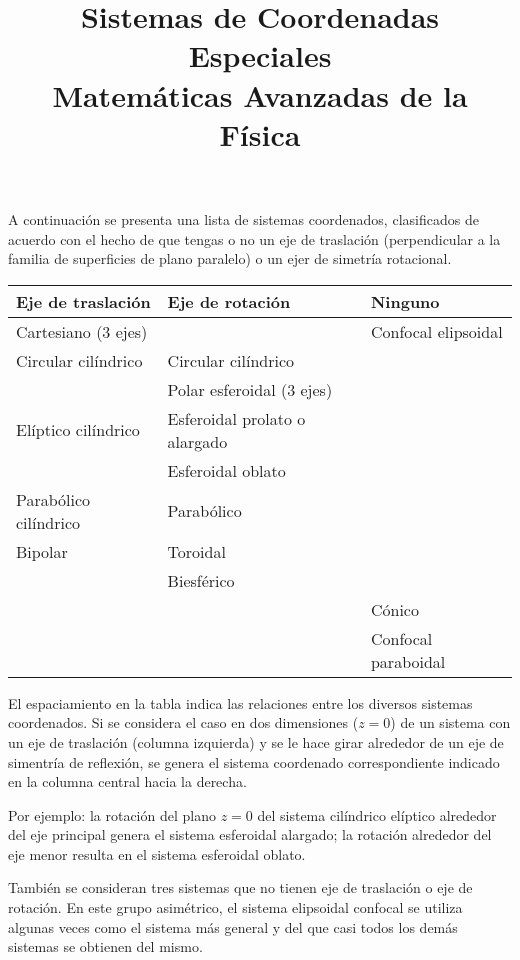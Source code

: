 
\author{}
\marginsize{1cm}{1cm}{1cm}{1cm} 
\title{Sistemas de Coordenadas Especiales \\ {\large Matemáticas Avanzadas de la Física}}
\date{ }

\renewcommand\labelenumii{\theenumi.{\arabic{enumii}}}
\maketitle
\fontsize{14}{14}\selectfont
\vspace{-2cm}
A continuación se presenta una lista de sistemas coordenados, clasificados de acuerdo con el hecho de que tengas o no un eje de traslación (perpendicular a la familia de superficies de plano paralelo) o un ejer de simetría rotacional.
\par
\begin{table}[H]
\fontsize{14}{14}\selectfont
\centering
\begin{tabular}{p{5cm} p{6cm} p{5cm}}
Eje de traslación & Eje de rotación & Ninguno \\ \hline
Cartesiano ($3$ ejes) & & Confocal elipsoidal \\[1em]
Circular cilíndrico & Circular cilíndrico & \\
 & Polar esferoidal ($3$ ejes) & \\[1em]
 Elíptico cilíndrico & Esferoidal prolato o alargado & \\
  & Esferoidal oblato & \\[1em]
Parabólico cilíndrico & Parabólico & \\[1em]
Bipolar & Toroidal & \\
 & Biesférico & \\[1em]
  & & Cónico \\
  & & Confocal paraboidal \\
\end{tabular}
\end{table}
El espaciamiento en la tabla indica las relaciones entre los diversos sistemas coordenados. Si se considera el caso en dos dimensiones ($z = 0$) de un sistema con un eje de traslación (columna izquierda) y se le hace girar alrededor de un eje de simentría de reflexión, se genera el sistema coordenado correspondiente indicado en la columna central hacia la derecha.
\par
Por ejemplo: la rotación del plano $z = 0$ del sistema cilíndrico elíptico alrededor del eje principal genera el sistema esferoidal alargado; la rotación alrededor del eje menor resulta en el sistema esferoidal oblato.
\par
También se consideran tres sistemas que no tienen eje de traslación o eje de rotación. En este grupo asimétrico, el sistema elipsoidal confocal se utiliza algunas veces como el sistema más general y del que casi todos los demás sistemas se obtienen del mismo.
